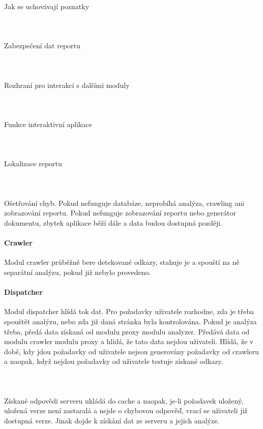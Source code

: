 \documentclass[10pt]{article}
\begin{document}
	\paragraph{~}Jak se uchovávají poznatky
	\paragraph{~}Zabezpečení dat reportu
	\paragraph{~}Rozhraní pro interakci s dalšími moduly
	\paragraph{~}Funkce interaktivní aplikace
	\paragraph{~}Lokalizace reportu
	\paragraph{~}Ošetřování chyb. Pokud nefunguje databáze, neprobíhá analýza, crawling ani zobrazování reportu. Pokud nefunguje zobrazování reportu nebo generátor dokumentu, zbytek aplikace běží dále a data budou dostupná později.
	\paragraph{Crawler} Modul crawler průběžně bere detekované odkazy, stahuje je a spouští na ně separátní analýzu, pokud již nebylo provedeno.
	\paragraph{Dispatcher} Modul dispatcher hlídá tok dat. Pro požadavky uživatele rozhodne, zda je třeba spouštět analýzu, nebo zda již daná stránka byla kontrolována. Pokud je analýza třeba, předá data získaná od modulu proxy modulu analyzer. Předává data od modulu crawler modulu proxy a hlídá, že tato data nejdou uživateli. Hlídá, že v době, kdy jdou požadavky od uživatele nejsou generovány požadavky od crawleru a naopak, když nejdou požadavky od uživatele testuje získané odkazy. 
	\paragraph{~} Získané odpovědi serveru ukládá do cache a naopak, je-li požadavek uložený, uložená verze není zastaralá a nejde o chybovou odpověď, vrací se uživateli již dostupná verze. Jinak dojde k získání dat ze serveru a jejich analýze.
\end{document}
